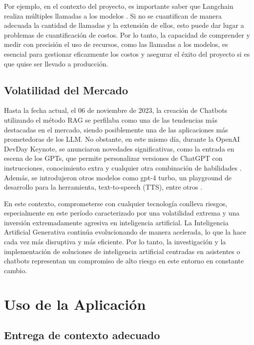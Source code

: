 Por ejemplo, en el contexto del proyecto, es importante saber que Langchain realiza múltiples llamadas a los modelos \cite{framework1}. Si no se cuantifican de manera adecuada 
la cantidad de llamadas y la extensión de ellos, esto puede dar lugar a problemas de cuantificación de costos. Por lo tanto, la capacidad de comprender y 
medir con precisión el uso de recursos, como las llamadas a los modelos, es esencial para gestionar eficazmente los costos y asegurar el éxito del proyecto 
si es que quise ser llevado a producción.


\subsection{Volatilidad del Mercado}

Hasta la fecha actual, el 06 de noviembre de 2023, la creación de Chatbots utilizando el método RAG se perfilaba como 
una de las tendencias más destacadas en el mercado, siendo posiblemente una de las aplicaciones más prometedoras de los LLM. 
No obstante, en este mismo día, durante la OpenAI DevDay Keynote, se anunciaron novedades significativas, como la entrada en 
escena de los GPTs, que permite personalizar versiones de ChatGPT con instrucciones, conocimiento extra y cualquier otra combinación 
de habilidades \cite{openai2}. Además, se introdujeron otros modelos como gpt-4 turbo, un playground de desarrollo para la herramienta, 
text-to-speech (TTS), entre otros \cite{openai3}.

En este contexto, comprometerse con cualquier tecnología conlleva riesgos, especialmente en este período caracterizado por una 
volatilidad extrema y una inversión extremadamente agresiva en inteligencia artificial. La Inteligencia Artificial Generativa 
continúa evolucionando de manera acelerada, lo que la hace cada vez más disruptiva y más eficiente. Por lo tanto, la investigación 
y la implementación de soluciones de inteligencia artificial centradas en asistentes o chatbots representan un compromiso de alto 
riesgo en este entorno en constante cambio.

\newpage

\section{Uso de la Aplicación}

\subsection{Entrega de contexto adecuado}

